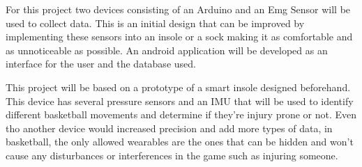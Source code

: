 For this project two devices consisting of an Arduino and an Emg Sensor will be used to collect data. This is an initial design that can be improved by implementing these sensors into an 
insole or a sock making it as comfortable and as unnoticeable as possible. An android application will be developed as an interface for the user and the database used.

This project will be based on a prototype of a smart insole designed beforehand. This device has several pressure sensors and an IMU that will be used to identify different basketball 
movements and determine if they're injury prone or not\cite{masterInsole, bachelorInsole}.
Even tho another device would increased precision and add more types of data, in basketball, the only allowed wearables are the ones that can be hidden and won't cause any disturbances 
or interferences in the game such as injuring someone. 


